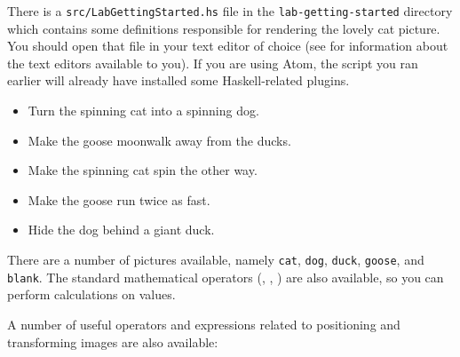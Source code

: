 \taskLine 

There is a \texttt{\small src/LabGettingStarted.hs} file in the \texttt{\small lab-getting-started} directory which contains some definitions responsible for rendering the lovely cat picture. You should open that file in your text editor of choice (see  for information about the text editors available to you). If you are using Atom, the  script you ran earlier will already have installed some Haskell-related plugins.


\begin{itemize}
	\item Turn the spinning cat into a spinning dog.
	\item Make the goose moonwalk away from the ducks.
	\item Make the spinning cat spin the other way.
	\item Make the goose run twice as fast.
	\item Hide the dog behind a giant duck.
\end{itemize}

There are a number of pictures available, namely \texttt{cat}, \texttt{dog}, \texttt{duck}, \texttt{goose}, and \texttt{blank}. The standard mathematical operators (\haskellIn{+}, \haskellIn{-}, \haskellIn{*}) are also available, so you can perform calculations on values.

A number of useful operators and expressions related to positioning and transforming images are also available:

